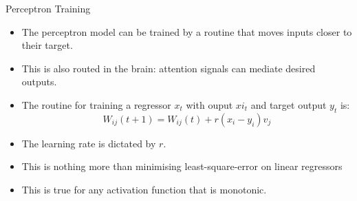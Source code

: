 \documentclass[
  ignorenonframetext,
]{beamer}
\begin{document}
\begin{frame}{Perceptron Training}
\protect\hypertarget{perceptron-training}{}
\begin{itemize}
\item
  The perceptron model can be trained by a routine that moves inputs
  closer to their target.
\item
  This is also routed in the brain: attention signals can mediate
  desired outputs.
\item
  The routine for training a regressor \(x_t\) with ouput \(xi_t\) and
  target output \(y_t\) is:
  \[W_{ij}(t+1) = W_{ij}(t) + r (x_i - y_i) v_j\]
\end{itemize}
\end{frame}

\begin{frame}{}
\protect\hypertarget{section-4}{}
\begin{itemize}
\item
  The learning rate is dictated by \(r\).
\item
  This is nothing more than minimising least-square-error on linear
  regressors
\item
  This is true for any activation function that is monotonic.
\end{itemize}
\end{frame}
\end{document}
